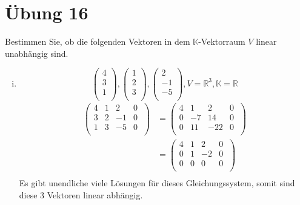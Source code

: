\documentclass{article}
\begin{document}
\newpage 
\section*{Übung 16}

Bestimmen Sie, ob die folgenden Vektoren in dem $\mathbb{K}$-Vektorraum $V$ linear unabhängig sind.

\begin{enumerate}[(i)]
\item
  \[
    \begin{pmatrix}
      4 \\
      3 \\
      1 \\
    \end{pmatrix},
    \begin{pmatrix}
      1 \\
      2 \\
      3 \\
    \end{pmatrix},
    \begin{pmatrix}
      2  \\
      -1 \\
      -5 \\
    \end{pmatrix},
    V = \mathbb{R}^3, \mathbb{K} = \mathbb{R}
  \]
  \begin{align*}
    \left(
    \begin{array}{ccc|c}
      4 & 1 & 2  & 0 \\
      3 & 2 & -1 & 0 \\
      1 & 3 & -5 & 0 \\
    \end{array}\
    \right)
    &=
    \left(
    \begin{array}{ccc|c}
      4 & 1 & 2    & 0 \\
      0 & -7 & 14  & 0 \\
      0 & 11 & -22 & 0 \\
    \end{array}\
    \right) \\
    &=
    \left(
    \begin{array}{ccc|c}
      4 & 1 & 2  & 0 \\
      0 & 1 & -2 & 0 \\
      0 & 0 & 0  & 0 \\
    \end{array}\
    \right) \\
  \end{align*}
  Es gibt unendliche viele Lösungen für dieses Gleichungssystem, somit sind diese 3 Vektoren linear abhängig.


\end{enumerate}
\end{document}
